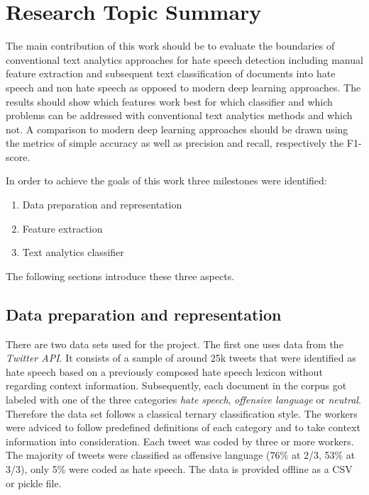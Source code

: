 \section{Research Topic Summary}

The main contribution of this work should be to evaluate the boundaries of conventional text analytics approaches for hate speech detection including manual feature extraction and subsequent text classification of documents into hate speech and non hate speech as opposed to modern deep learning approaches. The results should show which features work best for which classifier and which problems can be addressed with conventional text analytics methods and which not. A comparison to modern deep learning approaches should be drawn using the metrics of simple accuracy as well as precision and recall, respectively the F1-score. 

\newpage
\noindent
In order to achieve the goals of this work three milestones were identified: 

\begin{enumerate}
	\item Data preparation and representation
	\item Feature extraction
	\item Text analytics classifier
\end{enumerate}

\noindent
The following sections introduce these three aspects.

\subsection{Data preparation and representation}

There are two data sets used for the project. The first one \cite{ThomasDavidson.2020} uses data from the \textit{Twitter API}. It consists of a sample of around 25k tweets that were identified as hate speech based on a previously composed hate speech lexicon without regarding context information. Subsequently, each document in the corpus got labeled with one of the three categories \textit{hate speech}, \textit{offensive language} or \textit{neutral}. Therefore the data set follows a classical ternary classification style. The workers were adviced to follow predefined definitions of each category and to take context information into consideration. Each tweet was coded by three or more workers. The majority of tweets were classified as offensive language (76\% at 2/3, 53\% at 3/3), only 5\% were coded as hate speech. The data is provided offline as a CSV or pickle file. 

